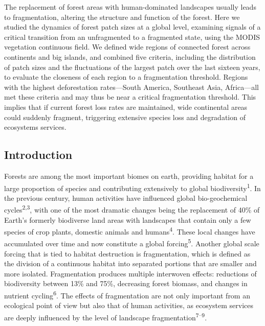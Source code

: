 \documentclass[]{article}
\begin{document}
The replacement of forest areas with human-dominated landscapes usually
leads to fragmentation, altering the structure and function of the
forest. Here we studied the dynamics of forest patch sizes at a global
level, examining signals of a critical transition from an unfragmented
to a fragmented state, using the MODIS vegetation continuous field. We
defined wide regions of connected forest across continents and big
islands, and combined five criteria, including the distribution of patch
sizes and the fluctuations of the largest patch over the last sixteen
years, to evaluate the closeness of each region to a fragmentation
threshold. Regions with the highest deforestation rates---South America,
Southeast Asia, Africa---all met these criteria and may thus be near a
critical fragmentation threshold. This implies that if current forest
loss rates are maintained, wide continental areas could suddenly
fragment, triggering extensive species loss and degradation of
ecosystems services.

\newpage

\subsection{Introduction}\label{introduction}

Forests are among the most important biomes on earth, providing habitat
for a large proportion of species and contributing extensively to global
biodiversity\textsuperscript{1}. In the previous century, human
activities have influenced global bio-geochemical
cycles\textsuperscript{2,3}, with one of the most dramatic changes being
the replacement of 40\% of Earth's formerly biodiverse land areas with
landscapes that contain only a few species of crop plants, domestic
animals and humans\textsuperscript{4}. These local changes have
accumulated over time and now constitute a global
forcing\textsuperscript{5}. Another global scale forcing that is tied to
habitat destruction is fragmentation, which is defined as the division
of a continuous habitat into separated portions that are smaller and
more isolated. Fragmentation produces multiple interwoven effects:
reductions of biodiversity between 13\% and 75\%, decreasing forest
biomass, and changes in nutrient cycling\textsuperscript{6}. The effects
of fragmentation are not only important from an ecological point of view
but also that of human activities, as ecosystem services are deeply
influenced by the level of landscape
fragmentation\textsuperscript{7--9}.
\end{document}
